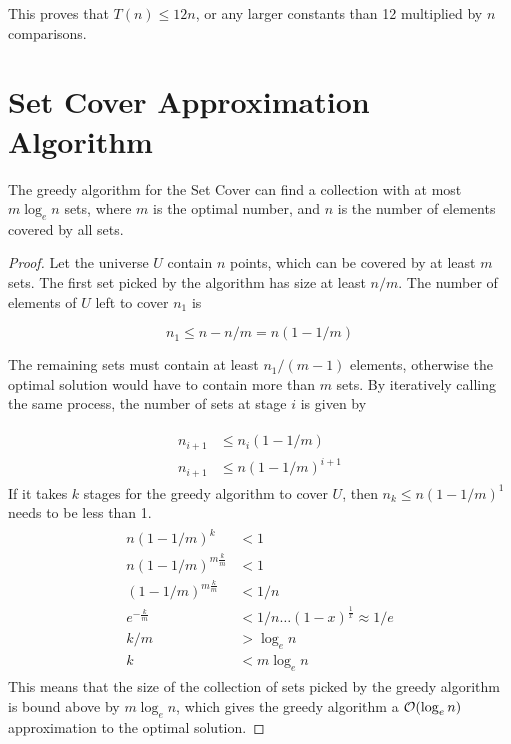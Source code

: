 This proves that $T(n) \le 12n$, or any larger constants than 12 multiplied by $n$ comparisons.



\section{Set Cover Approximation Algorithm}
\label{ann:setcover}


\begin{theorem}
	The greedy algorithm for the Set Cover can find a collection with at most $m \log_e n$ sets, where $m$ is the optimal number, and $n$ is the number of elements covered by all sets.
	
	\begin{proof}
		Let the universe $U$ contain $n$ points, which can be covered by at least $m$ sets. The first set picked by the algorithm has size at least $n/m$. The number of elements of $U$ left to cover $n_1$ is
		
		\begin{equation}
		n_1 \leq n - n/m = n(1-1/m)
		\end{equation}
		
		The remaining sets must contain at least $n_1/(m-1)$ elements, otherwise the optimal solution would have to contain more than $m$ sets. By iteratively calling the same process, the number of sets at stage $i$ is given by
		
		\begin{align}
		\begin{aligned}
		n_{i+1} & \leq n_i(1-1/m) \\ 
		n_{i+1} & \leq n(1-1/m)^{i+1}
		\end{aligned}
		\end{align}
		If it takes $k$ stages for the greedy algorithm to cover $U$, then $n_k \leq n(1-1/m)^1$ needs to be less than 1.
		\begin{align}
		\begin{aligned}
		n(1-1/m)^k & < 1 \\
		n(1-1/m)^{m \frac{k}{m}} & < 1\\
		(1-1/m)^{m \frac{k}{m}} & < 1/n\\
		e^{-\frac{k}{m}} & < 1/n \ldots (1-x)^\frac{1}{x} \approx 1/e\\
		k/m & > \log_e n \\
		k & < m\log_e n
		\end{aligned}
		\end{align}
		This means that the size of the collection of sets picked by the greedy algorithm is bound above by $m \log_e n$, which gives the greedy algorithm a $\mathcal{O}(\log_e n)$ approximation to the optimal solution.
		
	\end{proof}
\end{theorem}

